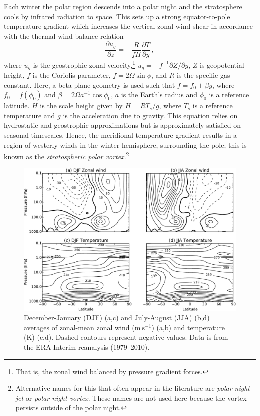 Each winter the polar region descends into a polar night and the stratosphere
cools by infrared radiation to space. This sets up a strong equator-to-pole
temperature gradient which increases the vertical zonal wind shear in accordance
with the thermal wind balance relation
\begin{equation}
\frac{\partial u_g}{\partial z} = -\frac{R}{fH}\frac{\partial T}{\partial y} \,, 
\end{equation} 
where $u_g$ is the geostrophic zonal velocity,\footnote{That is, the zonal wind
  balanced by pressure gradient forces.} $u_g = -f^{-1}\partial Z/\partial y$,
$Z$ is geopotential height, $f$ is the Coriolis parameter, $f=2\Omega\sin\phi$,
and $R$ is the specific gas constant. Here, a beta-plane geometry is used such
that $f=f_0+\beta y$, where $f_0=f(\phi_0)$ and
$\beta = 2\Omega a^{-1}\cos\phi_0$, $a$ is the Earth's radius and $\phi_{0}$ is
a reference latitude. $H$ is the scale height given by $H = RT_s/g$, where $T_s$
is a reference temperature and $g$ is the acceleration due to gravity. This
equation relies on hydrostatic and geostrophic approximations but is
approximately satisfied on seasonal timescales. Hence, the meridional
temperature gradient results in a region of westerly winds in the winter
hemisphere, surrounding the pole; this is known as the \emph{stratospheric polar
  vortex}.\footnote{Alternative names for this that often appear in the
  literature are \emph{polar night jet} or \emph{polar night vortex}. These
  names are not used here because the vortex persists outside of the polar
  night.}

\begin{figure}
 \centering
 \noindent\includegraphics[width=\textwidth]{figures/chapter-intro/zmzw_zmT_clim.pdf}
 \caption[Zonal-mean zonal wind and temperature climatology.]{December-January
   (DJF) (a,c) and July-August (JJA) (b,d) averages of zonal-mean zonal wind
   ($\mathrm{m~s^{-1}}$) (a,b) and temperature (K) (c,d). Dashed contours
   represent negative values. Data is from the ERA-Interim reanalysis
   (1979--2010).}
 \label{fig:zmzw_zmT_clim}
\end{figure}

